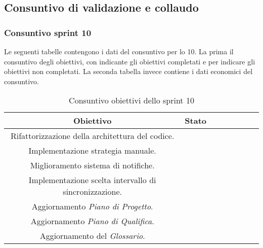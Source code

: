 \subsection{Consuntivo di validazione e collaudo}

\subsubsection{Consuntivo sprint 10}
Le seguenti tabelle contengono i dati del consuntivo per lo  10. La prima il consuntivo degli obiettivi, con \checkmark{} indicante gli obiettivi completati e \xmark{} per indicare gli obiettivi non completati. La seconda tabella invece contiene i dati economici del consuntivo.\newline{}
\begin{table}[H]
		\begin{center}
			\setlength{\aboverulesep}{0pt}
			\setlength{\belowrulesep}{0pt}
			\setlength{\extrarowheight}{.75ex}
			\begin{tabular}{ c c c c c c c c }
				\rowcolor{AzzurroGruppo!30} 
				\textbf{Obiettivo} & \textbf{Stato} \\
				\toprule
				Rifattorizzazione della architettura del codice. & \checkmark{} \\
				Implementazione strategia manuale. & \checkmark{} \\
				Miglioramento sistema di notifiche. & \checkmark{} \\
				Implementazione scelta intervallo di sincronizzazione. & \checkmark{} \\
				Aggiornamento \textit{Piano di Progetto}. & \checkmark{} \\
				Aggiornamento \textit{Piano di Qualifica}. & \checkmark{} \\
				Aggiornamento del \textit{Glossario}. & \checkmark{} \\
				\bottomrule
			\end{tabular}
			\caption{Consuntivo obiettivi dello sprint 10}
		\end{center}
	\end{table}

